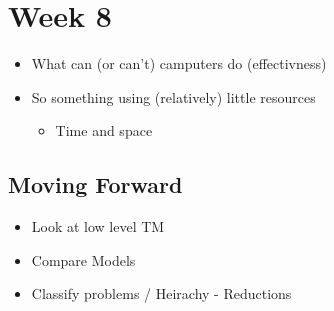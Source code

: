 \documentclass[11pt]{article}
\begin{document}
\section{Week 8}
\label{sec:org7dac399}
\begin{itemize}
\item What can (or can't) camputers do (effectivness)
\item So something using (relatively) little resources
\begin{itemize}
\item Time and space
\end{itemize}
\end{itemize}
\subsection{Moving Forward}
\label{sec:orgb49512e}
\begin{itemize}
\item Look at low level TM
\item Compare Models
\item Classify problems / Heirachy - Reductions
\end{itemize}
\end{document}
